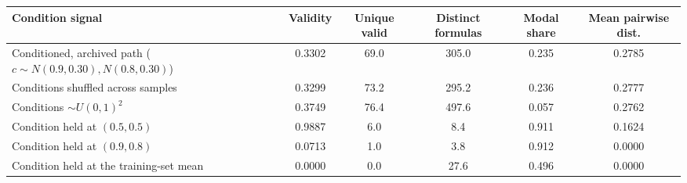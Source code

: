 \begin{tabular}{lccccc}
\toprule
Condition signal & Validity & Unique valid & Distinct formulas & Modal share & Mean pairwise dist. \\
\midrule
Conditioned, archived path ($c\sim N(0.9,0.30),N(0.8,0.30)$) & 0.3302 & 69.0 & 305.0 & 0.235 & 0.2785 \\
Conditions shuffled across samples & 0.3299 & 73.2 & 295.2 & 0.236 & 0.2777 \\
Conditions $\sim U(0,1)^2$ & 0.3749 & 76.4 & 497.6 & 0.057 & 0.2762 \\
Condition held at $(0.5,0.5)$ & 0.9887 & 6.0 & 8.4 & 0.911 & 0.1624 \\
Condition held at $(0.9,0.8)$ & 0.0713 & 1.0 & 3.8 & 0.912 & 0.0000 \\
Condition held at the training-set mean & 0.0000 & 0.0 & 27.6 & 0.496 & 0.0000 \\
\bottomrule
\end{tabular}
